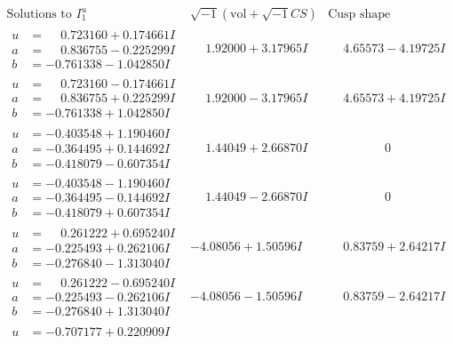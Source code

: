 \documentclass[1p]{elsarticle_modified}
\theoremstyle{definition}
\newcommand{\I}{\sqrt{-1}}
\begin{document}
$$\begin{array}{c|c|c}
\text{Solutions to }I^u_{1}& \I (\text{vol} + \sqrt{-1}CS) & \text{Cusp shape}\\
 \hline 
\begin{aligned}
u &= \phantom{-}0.723160 + 0.174661 I \\
a &= \phantom{-}0.836755 - 0.225299 I \\
b &= -0.761338 - 1.042850 I\end{aligned}
 & \phantom{-}1.92000 + 3.17965 I & \phantom{-}4.65573 - 4.19725 I \\ \hline\begin{aligned}
u &= \phantom{-}0.723160 - 0.174661 I \\
a &= \phantom{-}0.836755 + 0.225299 I \\
b &= -0.761338 + 1.042850 I\end{aligned}
 & \phantom{-}1.92000 - 3.17965 I & \phantom{-}4.65573 + 4.19725 I \\ \hline\begin{aligned}
u &= -0.403548 + 1.190460 I \\
a &= -0.364495 + 0.144692 I \\
b &= -0.418079 - 0.607354 I\end{aligned}
 & \phantom{-}1.44049 + 2.66870 I & \phantom{-0.000000 } 0 \\ \hline\begin{aligned}
u &= -0.403548 - 1.190460 I \\
a &= -0.364495 - 0.144692 I \\
b &= -0.418079 + 0.607354 I\end{aligned}
 & \phantom{-}1.44049 - 2.66870 I & \phantom{-0.000000 } 0 \\ \hline\begin{aligned}
u &= \phantom{-}0.261222 + 0.695240 I \\
a &= -0.225493 + 0.262106 I \\
b &= -0.276840 - 1.313040 I\end{aligned}
 & -4.08056 + 1.50596 I & \phantom{-}0.83759 + 2.64217 I \\ \hline\begin{aligned}
u &= \phantom{-}0.261222 - 0.695240 I \\
a &= -0.225493 - 0.262106 I \\
b &= -0.276840 + 1.313040 I\end{aligned}
 & -4.08056 - 1.50596 I & \phantom{-}0.83759 - 2.64217 I \\ \hline\begin{aligned}
u &= -0.707177 + 0.220909 I \\

\end{aligned}
\end{array}$$
\end{document}
